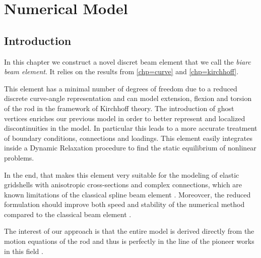 
\chapter{Numerical Model} \label{chp=numerical_model}

\section{Introduction}
In this chapter we construct a novel discret beam element that we call the \emph{biarc beam element}. It relies on the results from \cref{chp=curve} and \cref{chp=kirchhoff}.

This element has a minimal number of degrees of freedom due to a reduced discrete curve-angle representation and can model extension, flexion and torsion of the rod in the framework of Kirchhoff theory. The introduction of ghost vertices enriches our previous model \cite{DuPeloux2015,Lefevre2017} in order to better represent and localized discontinuities in the model. In particular this leads to a more accurate treatment of boundary conditions, connections and loadings. This element easily integrates inside a Dynamic Relaxation procedure to find the static equilibrium of nonlinear problems.

In the end, that makes this element very suitable for the modeling of elastic gridshells with anisotropic cross-sections and complex connections, which are known limitations of the classical  spline beam element \cite{Adriaenssens2001,Douthe2006}. Moreovcer, the reduced formulation should improve both speed and stability of the numerical method compared to the classical  beam element \cite{Adriaenssens2000,DAmico2014}.

The interest of our approach is that the entire model is derived directly from the motion equations of the rod and thus is perfectly in the line of the pioneer works in this field \cite{Day1965}.

